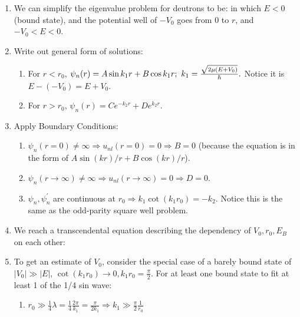 \documentclass{school-22.101-notes}
\begin{document}
\begin{enumerate}
\item We can simplify the eigenvalue problem for deutrons to be:
in which $E<0$ (bound state), and the potential well of $-V_0$ goes from $0$ to $r$, and $-V_0 < E < 0$. 

\item Write out general form of solutions:  
\begin{enumerate}
\item For $r < r_0$, $ \psi_n (r) = A \sin k_1 r + B \cos k_1 r; \mbox{ } k_1 = \frac{\sqrt{2 \mu (E+V_0)}}{\hbar}.$
Notice it is $E - (-V_0) = E + V_0$. 

\item For $r > r_0$, $\psi_n (r) = C e^{-k_2 r} + D e^{k_2 r}$.
\end{enumerate}

\item Apply Boundary Conditions:
\begin{enumerate}
\item $\psi_n (r=0) \neq \infty \Rightarrow  u_{nl} (r=0) = 0 \Rightarrow B = 0$ (because the equation is in the form of $A \sin(kr)/r + B \cos (kr)/r$). 

\item $\psi_n (r \to \infty) \neq \infty \Rightarrow u_{nl} (r\to \infty) = 0 \Rightarrow D = 0$. 

\item $\psi_n, \psi^{\prime}_n$ are continuous at $r_0 \Rightarrow k_1 \cot (k_1 r_0) = - k_2.$ Notice this is the same as the odd-parity square well problem. 
\end{enumerate}

\item We reach a transcendental equation describing the dependency of $V_0, r_0, E_B$ on each other:

\item To get an estimate of $V_0$, consider the special case of a barely bound state of $|V_0| \gg |E|$, $\cot (k_1 r_0) \to 0, k_1 r_0 = \frac{\pi}{2}$. For at least one bound state to fit at least 1 of the 1/4 sin wave: 
\begin{enumerate}
\item $ r_0 \gg \frac{1}{4}\lambda = \frac{1}{4}\frac{2 \pi}{k_1}  = \frac{\pi}{2k_1}  \Rightarrow k_1 \gg \frac{\pi}{2} \frac{1}{r_0} $


\end{enumerate}
\end{enumerate}
\end{document}
